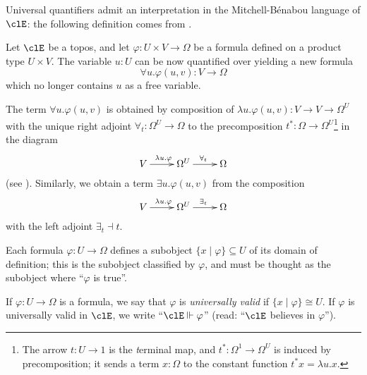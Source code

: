 Universal quantifiers admit an interpretation in the Mitchell-Bénabou language of $\clE$: the following definition comes from \cite[VI]{mac1992sheaves}.
\begin{definition}
	Let $\clE$ be a topos, and let $\varphi : U\times V \to \Omega$ be a formula defined on a product type $U\times V$. The variable $u:U$ can be now quantified over yielding a new formula 
	\[\forall u.\varphi(u,v) : V \to \Omega\]
	which no longer contains $u$ as a free variable.

	The term $\forall u.\varphi(u,v)$ is obtained by composition of $\lambda u.\varphi(u,v) : V \to V\to\Omega^U$ with the unique right adjoint $\forall_t : \Omega^U \to \Omega$ to the precomposition $t^*:\Omega \to \Omega^U$\footnote{The arrow $t:U\to 1$ is the \emph{t}erminal map, and $t^* : \Omega^1\to \Omega^U$ is induced by precomposition; it sends a term $x : \Omega$ to the constant function $t^*x=\lambda u.x$.} in the diagram 
	\[\xymatrix{
		V \ar[r]^{\lambda u.\varphi} & \Omega^U \ar[r]^{\forall_t} & \Omega
	}\]
	(see \cite[IV.9]{mac1992sheaves}). Similarly, we obtain a term $\exists u.\varphi(u,v)$ from the composition 
	\[\xymatrix{
		V \ar[r]^{\lambda u.\varphi} & \Omega^U \ar[r]^{\exists_t} & \Omega
	}\]
	with the left adjoint $\exists_t \dashv t$.
\end{definition}
Each formula $\varphi : U \to \Omega$ defines a subobject $\{x\mid \varphi\} \subseteq U$ of its domain of definition; this is the subobject classified by $\varphi$, and must be thought as the subobject where ``$\varphi$ is true''.

If $\varphi : U\to\Omega$ is a formula, we say that $\varphi$ is \emph{universally valid} if $\{x\mid\varphi\}\cong U$. If $\varphi$ is universally valid in $\clE$, we write ``$\clE\Vdash \varphi$'' (read: ``$\clE$ believes in $\varphi$'').

